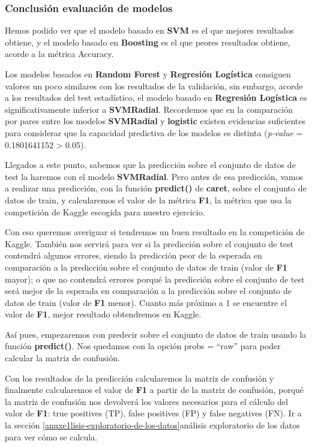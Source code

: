 \documentclass[]{article}
\begin{document}
\hypertarget{conclusiuxf3n-evaluaciuxf3n-de-modelos}{%
\subsubsection{Conclusión evaluación de
modelos}\label{conclusiuxf3n-evaluaciuxf3n-de-modelos}}

Hemos podido ver que el modelo basado en \textbf{SVM} es el que mejores resultados obtiene, y el modelo basado en \textbf{Boosting} es el que peores resultados obtiene, acorde a la métrica Accuracy. 

Los modelos basados en \textbf{Random Forest} y \textbf{Regresión Logística} consiguen valores un poco similares con los resultados de la validación, sin embargo, acorde a los resultados del test estadístico, el modelo basado en \textbf{Regresión Logística} es significativamente inferior a \textbf{SVMRadial}. Recordemos que en la comparación por pares entre los modelos \textbf{SVMRadial} y \textbf{logistic} existen evidencias suficientes para considerar que la capacidad predictiva de los modelos es distinta (\emph{p-value} = 0.1801641152 \textgreater{} 0.05).

Llegados a este punto, sabemos que la predicción sobre el conjunto de datos de test la haremos con el modelo \textbf{SVMRadial}. Pero antes de esa predicción, vamos a realizar una predicción, con la función \textbf{predict()} de \textbf{caret}, sobre el conjunto de datos de train, y calcularemos el valor de la métrica \textbf{F1}, la métrica que usa la competición de Kaggle escogida para nuestro ejercicio.

Con eso queremos averiguar si tendremos un buen resultado en la competición de Kaggle. También nos servirá para ver si la predicción sobre el conjunto de test contendrá algunos errores, siendo la predicción peor de la esperada en comparación a la predicción sobre el conjunto de datos de train (valor de \textbf{F1} mayor); o que no contendrá errores porqué la predicción sobre el conjunto de test será mejor de la esperada en comparación a la predicción sobre el conjunto de datos de train (valor de \textbf{F1} menor). Cuanto más próximo a 1 se encuentre el valor de \textbf{F1}, mejor resultado obtendremos en Kaggle.

Así pues, empezaremos con predecir sobre el conjunto de datos de train usando la función \textbf{predict()}. Nos quedamos con la opción probs = ``raw'' para poder calcular la matriz de confusión.


Con los resultados de la predicción calcularemos la matriz de confusión y finalmente calcularemos el valor de \textbf{F1} a partir de la matriz de confusión, porqué la matriz de confusión nos devolverá los valores necesarios para el cálculo del valor de \textbf{F1}: true positives (TP), false positives (FP) y false negatives (FN). Ir a la sección \ref{anuxe1lisis-exploratorio-de-los-datos}{análisis exploratorio} de los datos para ver cómo se calcula.
\end{document}
